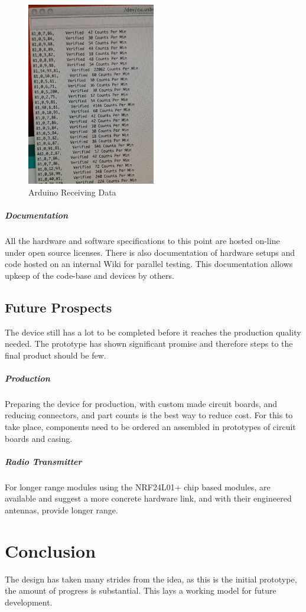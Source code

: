 \documentclass[10pt]{article}
\begin{document}
\begin{figure}[h]
	\centering
	\includegraphics[width=0.5\textwidth]{ArduinoRX}
	\caption{Arduino Receiving Data \label{arduinorx}}
\end{figure}

\subparagraph{Documentation}
All the hardware and software specifications to this point are hosted on-line under open source licenses. There is also documentation of hardware setups and code hosted on an internal Wiki for parallel testing. This documentation allows upkeep of the code-base and devices by others.

\subsection*{Future Prospects}
The device still has a lot to be completed before it reaches the production quality needed. The prototype has shown significant promise and therefore steps to the final product should be few.

\subparagraph{Production}
Preparing the device for production, with custom made circuit boards, and reducing connectors, and part counts is the best way to reduce cost. For this to take place, components need to be ordered an assembled in prototypes of circuit boards and casing.

\subparagraph{Radio Transmitter}

For longer range modules using the NRF24L01+ chip based modules, are available and suggest a more concrete hardware link, and with their engineered antennas, provide longer range.

\section{Conclusion}

The design has taken many strides from the idea, as this is the initial prototype, the amount of progress is substantial. This lays a working model for future development. 

\pagebreak


\end{document}
